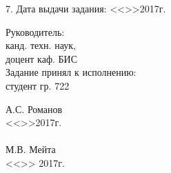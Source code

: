 7. Дата выдачи задания: 
<<\underline{\hspace{1cm}}>>\underline{\hspace{3cm}}2017г.

\begin{singlespace}
 \begin{minipage}[left]{0.40\linewidth}
 Руководитель: \\
  канд. техн. наук, \\доцент каф. БИС \\
  

 Задание принял к исполнению:\\
 студент гр. 722\\
 \end{minipage}
  \hfill
 \begin{minipage}[left]{0.45\linewidth}
  \vspace{0.7cm}
\underline{\hspace{3cm}} А.С. Романов \\
  <<\underline{\hspace{1cm}}>>\underline{\hspace{3cm}}2017г.\\
 \vspace{0.3cm}\\ 
  \underline{\hspace{3cm}}М.В. Мейта  \\
 <<\underline{\hspace{1cm}}>>\underline{\hspace{3cm}} 2017г.\\
 \end{minipage}
\end{singlespace}
